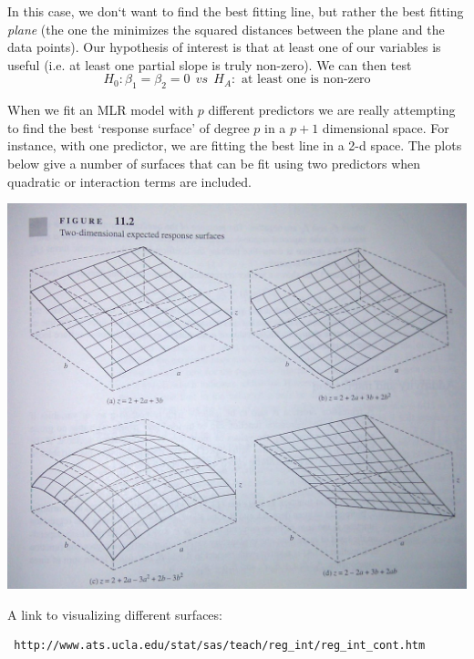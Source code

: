 \newpage

In this case, we don`t want to find the best fitting line, but rather the best fitting \textit{plane} (the one the minimizes the squared distances between the plane and the data points). Our hypothesis of interest is that at least one of our variables is useful (i.e. at least one partial slope is truly non-zero).  We can then test
$$H_0: \beta_1=\beta_2=0 ~~vs~~H_A: \text{ at least one is non-zero}$$


When we fit an MLR model with $p$ different predictors we are really attempting to find the best `response surface' of degree $p$ in a $p+1$ dimensional space.  For instance, with one predictor, we are fitting the best line in a 2-d space.  The plots below give a number of surfaces that can be fit using two predictors when quadratic or interaction terms are included.

\begin{center}
\includegraphics[scale=0.3]{surfaces}
\end{center}

A link to visualizing different surfaces:  \begin{verbatim} http://www.ats.ucla.edu/stat/sas/teach/reg_int/reg_int_cont.htm \end{verbatim}~\\

\newpage

